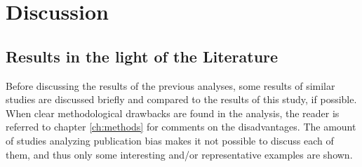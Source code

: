 \documentclass[11pt,a4paper,twoside]{book}\usepackage[]{graphicx}\usepackage[]{color}
\begin{document}
% 












\chapter{Discussion} \label{ch:Discussion}

\section{Results in the light of the Literature}\label{sec:discussion.results}

Before discussing the results of the previous analyses, some results of similar studies are discussed briefly and compared to the results of this study, if possible.
When clear methodological drawbacks are found in the analysis, the reader is referred to chapter \ref{ch:methods} for comments on the disadvantages. The amount of studies analyzing publication bias makes it not possible to discuss each of them, and thus only some interesting and/or representative examples are shown.
\end{document}
